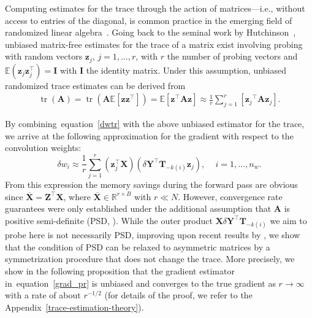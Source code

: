\documentclass[10pt]{article}
\def\eqref#1{equation~\ref{#1}}
\newcommand{\B}{\mathbf}
\begin{document}
Computing estimates for the trace through the action of matrices---i.e., without access to entries of the diagonal, is common practice in the emerging field of randomized linear algebra~\citep{TroppLR,martinsson_tropp_2020}. Going back to the seminal work by Hutchinson~\citep{Hutchinson, hutchpp}, unbiased matrix-free estimates for the trace of a matrix exist involving probing with random vectors $\B{z}_j,\,j=1,\ldots, r$, with $r$ the number of probing vectors and $\mathbb{E}(\B{z}_j{\B{z}_j^\top})=\B{I}$ with $\B{I}$ the identity matrix. Under this assumption, unbiased randomized trace estimates can be derived from
\begin{equation}
\begin{aligned}
\operatorname{tr}(\B{A}) =\operatorname{tr}\left(\B{A} \mathbb{E}\left[\B{z} \B{z}^{\top}\right]\right)
               =\mathbb{E}\left[\B{z}^{\top} \B{A} \B{z}\right]
                \approx \frac{1}{r}\sum_{j=1}^r\left[{\B{z}_j}^{\top} \B{A} \B{z}_j\right].
\end{aligned}
\label{trdef}
\end{equation}

By combining~\eqref{dwtr} with the above unbiased estimator for the trace, we arrive at the following approximation for the gradient with respect to the convolution weights:
\begin{equation}
  \delta w_i \approx \frac{1}{r} \sum_{j=1}^r \left(\B{z}_j^\top\B{X} \right)\left(\delta \B{Y}^\top\B{T}_{-k(i)}\B{z}_j\right),\, \quad i=1,\ldots ,n_w.
  \label{grad_pr}
\end{equation}
From this expression the memory savings during the forward pass are obvious since $\B{\overline{X}}=\B{Z}^\top\B{X}$, where $\B{\overline{X}}\in\mathbb{R}^{r\times B}$ with $r\ll N$. However, convergence rate guarantees were only established under the additional assumption that $\B{A}$ is positive semi-definite (PSD, \citep{Kaperick2019DiagonalEW}). While the outer product $\B{X}\delta\B{Y}^\top\B{T}_{-k(i)}$ we aim to probe here is not necessarily PSD, improving upon recent results by \citep{cortinovis2020randomized}, we show that the condition of PSD can be relaxed to asymmetric matrices by a symmetrization procedure that does not change the trace. More precisely, we show in the following proposition that the gradient estimator in~\eqref{grad_pr} is unbiased and converges to the true gradient as $r\rightarrow\infty$ with a rate of about $r^{-1/2}$ (for details of the proof, we refer to the Appendix~\ref{trace-estimation-theory}).
\end{document}
